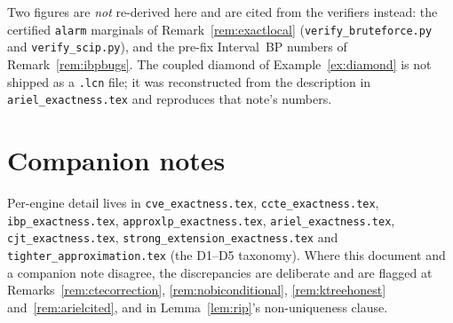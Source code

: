 \documentclass[11pt]{article}
\theoremstyle{definition}
\begin{document}
Two figures are \emph{not} re-derived here and are cited from the verifiers instead: the certified
\texttt{alarm} marginals of Remark~\ref{rem:exactlocal} (\texttt{verify\_bruteforce.py} and
\texttt{verify\_scip.py}), and the pre-fix Interval~BP numbers of Remark~\ref{rem:ibpbugs}. The
coupled diamond of Example~\ref{ex:diamond} is not shipped as a \texttt{.lcn} file; it was
reconstructed from the description in \texttt{ariel\_exactness.tex} and reproduces that note's
numbers.

\section*{Companion notes}
Per-engine detail lives in \texttt{cve\_exactness.tex}, \texttt{ccte\_exactness.tex},
\texttt{ibp\_exactness.tex}, \texttt{approxlp\_exactness.tex}, \texttt{ariel\_exactness.tex},
\texttt{cjt\_exactness.tex}, \texttt{strong\_extension\_\allowbreak exactness.tex} and
\texttt{tighter\_approximation.tex} (the D1--D5 taxonomy). Where this document and a companion note
disagree, the discrepancies are deliberate and are flagged at Remarks~\ref{rem:ctecorrection},
\ref{rem:nobiconditional}, \ref{rem:ktreehonest} and~\ref{rem:arielcited}, and in
Lemma~\ref{lem:rip}'s non-uniqueness clause.
\end{document}
